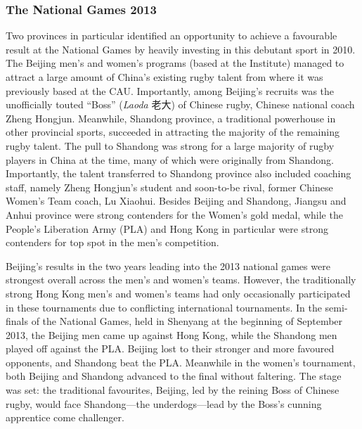 \begin{CJK}{UTF8}{gbsn}
 \subsubsection{The National Games 2013\label{sect:fallFromGrace}}
 Two provinces in particular identified an opportunity to achieve a favourable result at the National Games by heavily investing in this debutant sport in 2010.  The Beijing men's and women's programs (based at the Institute) managed to attract a large amount of China's existing rugby talent from where it was previously based at the CAU.  Importantly, among Beijing's recruits was the unofficially touted ``Boss''  (\textit{Laoda} 老大) of Chinese rugby, Chinese national coach Zheng Hongjun.  Meanwhile, Shandong province, a traditional powerhouse in other provincial sports, succeeded in attracting the majority of the remaining rugby talent.  The pull to Shandong was strong for a large majority of rugby players in China at the time, many of which were originally from Shandong.  Importantly, the talent transferred to Shandong province also included coaching staff, namely Zheng Hongjun's student and soon-to-be rival, former Chinese Women's Team coach, Lu Xiaohui.  Besides Beijing and Shandong, Jiangsu and Anhui province were strong contenders for the Women's gold medal, while the People's Liberation Army (PLA) and Hong Kong in particular were strong contenders for top spot in the men's competition.

 Beijing's results in the two years leading into the 2013 national games were strongest overall across the men's and women's teams.   However, the traditionally strong Hong Kong men's and women's teams had only occasionally participated in these tournaments due to conflicting international tournaments.  In the semi-finals of the National Games, held in Shenyang at the beginning of September 2013, the Beijing men came up against Hong Kong, while the Shandong men played off against the PLA.  Beijing lost to their stronger and more favoured opponents, and Shandong beat the PLA.  Meanwhile in the women's tournament, both Beijing and Shandong advanced to the final without faltering.  The stage was set: the traditional favourites, Beijing, led by the reining Boss of Chinese rugby, would face Shandong---the underdogs---lead by the Boss's cunning apprentice come challenger.


\end{CJK}
